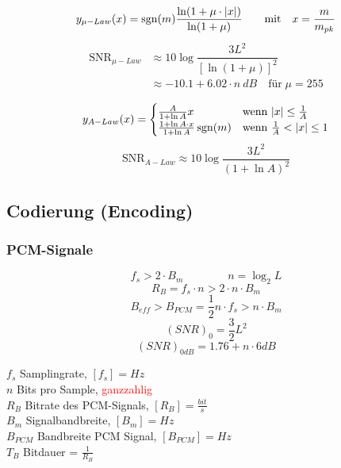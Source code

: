 \begin{minipage}{9cm}
$$ y_{\mu-Law}(x) = \operatorname{sgn}(m) \frac{\ln(1+\mu\cdot|x|)}{\ln(1+\mu)} \qquad \text{mit} \quad
x = \frac{m}{m_{pk}}$$
\vspace*{-0.5cm}
\begin{align*}\text{SNR}_{\mu-Law} &\approx 10 \log \dfrac{3 L^2}{[\ln(1 + \mu)]^2} \\
	&\approx -10.1 + 6.02 \cdot n \: dB \quad \text{f\"ur} \; \mu = 255 \end{align*}
\end{minipage}
\begin{minipage}{9cm}
$$y_{A-Law}(x)=\begin{cases} \frac{A}{1+ \ln A} x & \mbox{wenn } |x| \le \frac{1}{A} \\
	\frac{1 + \ln A\cdot x}{1+ \ln A}\operatorname{sgn}(m) & \mbox{wenn } \frac{1}{A} < |x| \le 1 \end{cases} $$
$$\text{SNR}_{A-Law} \approx 10 \log \dfrac{3 L^2}{(1+\ln A)^2}$$
\end{minipage}

\subsection{Codierung (Encoding) }

\subsubsection{PCM-Signale}
\begin{minipage}{9cm}
	$$ f_s > 2 \cdot B_m  \qquad \qquad n = \log_2 L$$ 
	$$ R_B = f_s \cdot n > 2 \cdot n \cdot B_m $$ 
	$$ B_{eff} > B_{PCM} = \frac{1}{2} n \cdot f_s > n \cdot B_m$$
	$$(SNR)_0 = \frac{3}{2}L^2$$
	$$(SNR)_{0dB}
		= 1.76 + n \cdot  6dB$$
\end{minipage}
\begin{minipage}{9cm}
	$f_s$ Samplingrate, $[f_s] = Hz$ \\
	$n$ Bits pro Sample, \textcolor{red}{ganzzahlig} \\
	$R_B$ Bitrate des PCM-Signals, $[R_B] = \frac{bit}{s}$ \\
	$B_m$ Signalbandbreite, $[B_m] = Hz $ \\
	$B_{PCM}$ Bandbreite PCM Signal, $[B_{PCM}] = Hz $\\
	$T_B$ Bitdauer = $\frac{1}{R_B}$
\end{minipage}



